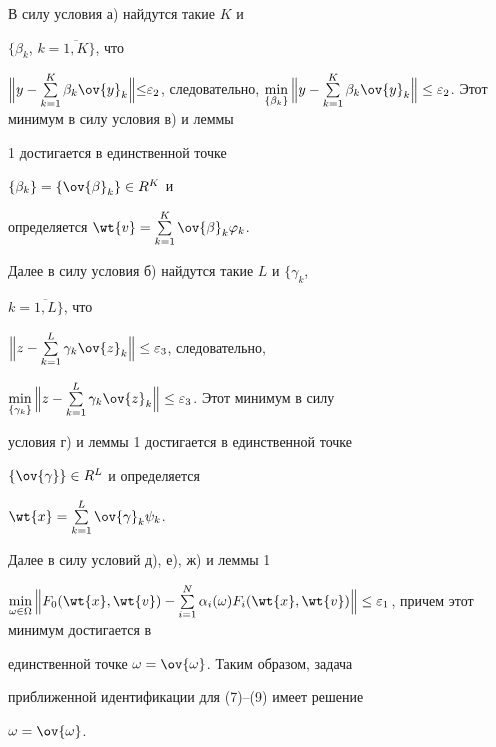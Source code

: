 \begin{pf}


В силу условия а) найдутся такие $K$ и


$\{\beta_k$, $k=\overline{1,K}\}$, что


$\Big\|y-\sum\limits^K_{k=1}\beta_k\ov{y}_k\Big\|


{\leq}\varepsilon_2$, следовательно, $\min\limits_{\{\beta_k\}} \Big\|y-


\sum\limits^K_{k=1}\beta_k\ov{y}_k\Big\|


\leq\varepsilon_2$. Этот минимум в силу условия в) и леммы


1 достигается в единственной точке


$\{\beta_k\}=\{\ov{\beta}_k\}\in R^K$ и


определяется $\wt{v}=


\sum\limits^K_{k=1}\ov{\beta}_k\varphi_k$.





Далее в силу условия б) найдутся такие $L$ и $\{\gamma_k$,


$k=\overline{1,L}\}$, что


$\Big\|z-\sum\limits^L_{k=1}\gamma_k\ov{z}_k\Big\|


\leq\varepsilon_3$, следовательно,


$\min\limits_{\{\gamma_k\}}\Big\|z-\sum\limits^L_{k=1}


\gamma_k\ov{z}_k\Big\|\leq\varepsilon_3$. Этот минимум в силу


условия г) и леммы 1 достигается в единственной точке


$\{\ov{\gamma}\}\in R^L$ и определяется


$\wt{x}=\sum\limits^L_{k=1}\ov{\gamma}_k\psi_k$.





Далее в силу условий д), е), ж) и леммы 1


$\min\limits_{\omega\in\Omega}\Big\|F_0(\wt{x},\wt{v})-


\sum\limits^N_{i=1}\alpha_i(\omega)F_i(\wt{x},\wt{v})


\Big\|\leq\varepsilon_1$, причем этот минимум достигается в


единственной точке $\omega=\ov{\omega}$. Таким образом, задача


приближенной идентификации для (7)--(9) имеет решение


$\omega=\ov{\omega}$.


\end{pf}





